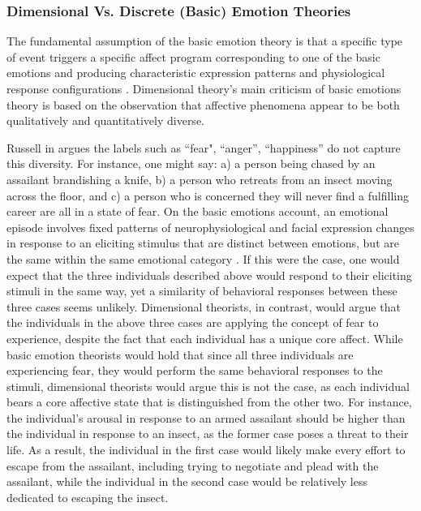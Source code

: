 \documentclass[12pt]{report}
\begin{document}
\subsubsection{Dimensional Vs. Discrete (Basic) Emotion Theories}

The fundamental assumption of the basic emotion theory is that a specific type
of event triggers a specific affect program corresponding to one of the basic
emotions and producing characteristic expression patterns and physiological
response configurations \cite{scherer:emotions-emergent}. Dimensional theory's
main criticism of basic emotions theory is based on the observation that
affective phenomena appear to be both qualitatively and quantitatively diverse.

Russell in \cite{russell:core-affect} argues the labels such as ``fear",
``anger'', ``happiness'' do not capture this diversity. For instance, one might
say: a) a person being chased by an assailant brandishing a knife, b) a person
who retreats from an insect moving across the floor, and c) a person who is
concerned they will never find a fulfilling career are all in a state of
fear. On the basic emotions account, an emotional episode involves fixed
patterns of neurophysiological and facial expression changes in response to an
eliciting stimulus that are distinct between emotions, but are the same within
the same emotional category \cite{ekman:argument-emotions}. If this were the
case, one would expect that the three individuals described above would respond
to their eliciting stimuli in the same way, yet a similarity of behavioral
responses between these three cases seems unlikely. Dimensional theorists, in
contrast, would argue that the individuals in the above three cases are applying
the concept of fear to experience, despite the fact that each individual has a
unique core affect. While basic emotion theorists would hold that since all
three individuals are experiencing fear, they would perform the same behavioral
responses to the stimuli, dimensional theorists would argue this is not the
case, as each individual bears a core affective state that is distinguished from
the other two. For instance, the individual's arousal in response to an armed
assailant should be higher than the individual in response to an insect, as the
former case poses a threat to their life. As a result, the individual in the
first case would likely make every effort to escape from the assailant,
including trying to negotiate and plead with the assailant, while the individual
in the second case would be relatively less dedicated to escaping the insect. 
\end{document}
